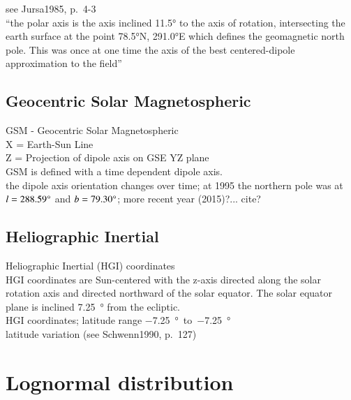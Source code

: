 see Jursa1985, p.~4-3\\
``the polar axis is the axis inclined 11.5° to the axis of rotation, intersecting the earth surface at the point 78.5°N, 291.0°E which defines the geomagnetic north pole. This was once at one time the axis of the best centered-dipole approximation to the field''\\


\subsection*{Geocentric Solar Magnetospheric}

GSM - Geocentric Solar Magnetospheric\\
X = Earth-Sun Line\\
Z = Projection of dipole axis on GSE YZ plane\\

GSM is defined with a time dependent dipole axis.\\
the dipole axis orientation changes over time; at 1995 the northern pole was at $l = 288.59\degree$ and $b = 79.30\degree$; more recent year (2015)?... cite?\\

\subsection*{Heliographic Inertial}

Heliographic Inertial (HGI) coordinates\\
HGI coordinates are Sun-centered with the z-axis directed along the solar rotation axis and directed northward of the solar equator. The solar equator plane is inclined \SI{7.25}{\degree} from the ecliptic.\\

HGI coordinates; latitude range \SI{-7.25}{\degree}~to~\SI{-7.25}{\degree}\\
latitude variation (see Schwenn1990, p.~127)\\


\section{Lognormal distribution}
\label{sec:lognormal_distribution}

